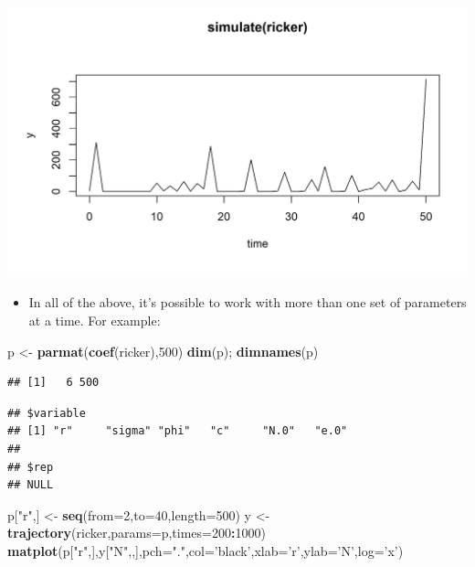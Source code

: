 \documentclass[]{article}
\newenvironment{Shaded}{\begin{snugshade}}{\end{snugshade}}
\newcommand{\KeywordTok}[1]{\textcolor[rgb]{0.13,0.29,0.53}{\textbf{#1}}}
\newcommand{\DataTypeTok}[1]{\textcolor[rgb]{0.13,0.29,0.53}{#1}}
\newcommand{\DecValTok}[1]{\textcolor[rgb]{0.00,0.00,0.81}{#1}}
\newcommand{\StringTok}[1]{\textcolor[rgb]{0.31,0.60,0.02}{#1}}
\newcommand{\OperatorTok}[1]{\textcolor[rgb]{0.81,0.36,0.00}{\textbf{#1}}}
\newcommand{\NormalTok}[1]{#1}
\providecommand{\tightlist}{%
  \setlength{\itemsep}{0pt}\setlength{\parskip}{0pt}}
\begin{document}
\begin{center}\includegraphics{figure/intro-unnamed-chunk-6-1} \end{center}

\begin{itemize}
\tightlist
\item
  In all of the above, it's possible to work with more than one set of
  parameters at a time. For example:
\end{itemize}

\begin{Shaded}
\begin{Highlighting}[]
\NormalTok{p <-}\StringTok{ }\KeywordTok{parmat}\NormalTok{(}\KeywordTok{coef}\NormalTok{(ricker),}\DecValTok{500}\NormalTok{)}
\KeywordTok{dim}\NormalTok{(p); }\KeywordTok{dimnames}\NormalTok{(p)}
\end{Highlighting}
\end{Shaded}

\begin{verbatim}
## [1]   6 500
\end{verbatim}

\begin{verbatim}
## $variable
## [1] "r"     "sigma" "phi"   "c"     "N.0"   "e.0"  
## 
## $rep
## NULL
\end{verbatim}

\begin{Shaded}
\begin{Highlighting}[]
\NormalTok{p[}\StringTok{"r"}\NormalTok{,] <-}\StringTok{ }\KeywordTok{seq}\NormalTok{(}\DataTypeTok{from=}\DecValTok{2}\NormalTok{,}\DataTypeTok{to=}\DecValTok{40}\NormalTok{,}\DataTypeTok{length=}\DecValTok{500}\NormalTok{)}
\NormalTok{y <-}\StringTok{ }\KeywordTok{trajectory}\NormalTok{(ricker,}\DataTypeTok{params=}\NormalTok{p,}\DataTypeTok{times=}\DecValTok{200}\OperatorTok{:}\DecValTok{1000}\NormalTok{)}
\KeywordTok{matplot}\NormalTok{(p[}\StringTok{"r"}\NormalTok{,],y[}\StringTok{"N"}\NormalTok{,,],}\DataTypeTok{pch=}\StringTok{"."}\NormalTok{,}\DataTypeTok{col=}\StringTok{'black'}\NormalTok{,}\DataTypeTok{xlab=}\StringTok{'r'}\NormalTok{,}\DataTypeTok{ylab=}\StringTok{'N'}\NormalTok{,}\DataTypeTok{log=}\StringTok{'x'}\NormalTok{)}
\end{Highlighting}
\end{Shaded}
\end{document}
